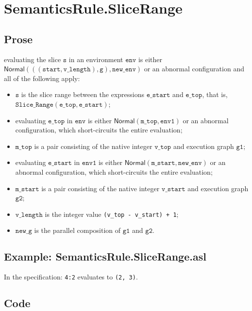 \documentclass{book}
\newcommand\ProseOrAbnormal[0]{or an abnormal configuration, which short-circuits the entire evaluation}
\newcommand\Normal[0]{\textsf{Normal}}
\newcommand\newenv[0]{\texttt{new\_env}}
\newcommand\env[0]{\texttt{env}}
\newcommand\envone[0]{\texttt{env1}}
\newcommand\vg[0]{\texttt{g}}
\newcommand\newg[0]{\texttt{new\_g}}
\newcommand\vs[0]{\texttt{s}}
\newcommand\vgone[0]{\texttt{g1}}
\newcommand\vgtwo[0]{\texttt{g2}}
\newcommand\start[0]{\texttt{start}}
\newcommand\mstart[0]{\texttt{m\_start}}
\newcommand\vstart[0]{\texttt{v\_start}}
\newcommand\estart[0]{\texttt{e\_start}}
\newcommand\vlength[0]{\texttt{v\_length}}
\newcommand\etop[0]{\texttt{e\_top}}
\newcommand\vvtop[0]{\texttt{v\_top}}
\newcommand\mtop[0]{\texttt{m\_top}}
\begin{document}

\section{SemanticsRule.SliceRange \label{sec:SemanticsRule.SliceRange}}
  \subsection{Prose}
  evaluating the slice $\vs$ in an environment $\env$ is either \\
  $\Normal(((\start, \vlength), \vg), \newenv)$
  or an abnormal configuration and all of the following apply:
  \begin{itemize}
    \item $\vs$ is the slice range between the
      expressions $\estart$ and $\etop$, that is, \\ $\texttt{Slice\_Range}(\etop, \estart)$;
    \item evaluating $\etop$ in $\env$ is either $\Normal(\mtop, \envone)$ \ProseOrAbnormal;
    \item $\mtop$ is a pair consisting of the native integer $\vvtop$ and execution graph $\vgone$;
    \item evaluating $\estart$ in $\envone$ is either $\Normal(\mstart, \newenv)$ \ProseOrAbnormal;
    \item $\mstart$ is a pair consisting of the native integer $\vstart$ and execution graph $\vgtwo$;
    \item $\vlength$ is the integer value \texttt{(v\_top - v\_start) + 1};
    \item $\newg$ is the parallel composition of $\vgone$ and $\vgtwo$.
  \end{itemize}

  \subsection{Example: SemanticsRule.SliceRange.asl}
  In the specification:
  \texttt{4:2} evaluates to \texttt{(2, 3)}.

  \subsection{Code}
\end{document}

